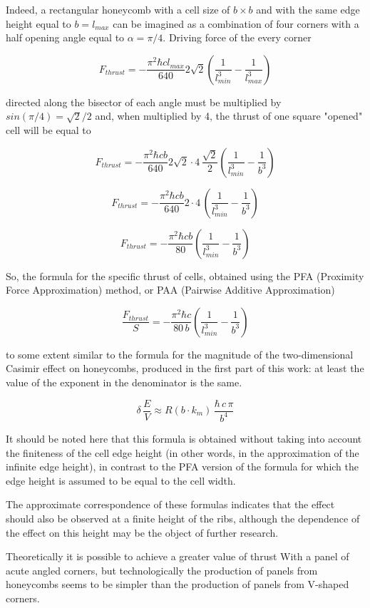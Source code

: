 \documentclass[11pt]{article}
\begin{document}
Indeed, a rectangular honeycomb with a cell size of \(b \times b\) and
with the same edge height equal to \(b = l_{max}\) can be imagined as a
combination of four corners with a half opening angle equal to
\(\alpha = {\pi}/{4}\). Driving force of the every corner

\[F_{thrust} = - \frac{\pi^2\hbar c l_{max}}{640} 2\sqrt{2} \left(\frac{1}{l_{min}^3} - \frac{1}{l_{max}^3}\right)\]

directed along the bisector of each angle must be multiplied by
\(sin\left({\pi}/{4}\right)={\sqrt{2}}\big/{2}\) and, when multiplied by
4, the thrust of one square "opened" cell will be equal to

\[F_{thrust} = - \frac{\pi^2\hbar c b}{640} 2\sqrt{2}\cdot4\,\frac{\sqrt{2}}{2} \left(\frac{1}{l_{min}^3} - \frac{1}{b^3}\right)\]

\[F_{thrust} = - \frac{\pi^2\hbar c b}{640} 2\cdot4\,\left(\frac{1}{l_{min}^3} - \frac{1}{b^3}\right)\]

\[F_{thrust} = - \frac{\pi^2\hbar c b}{80} \left(\frac{1}{l_{min}^3} - \frac{1}{b^3}\right)\]

So, the formula for the specific thrust of cells, obtained using the PFA
(Proximity Force Approximation) method, or PAA (Pairwise Additive
Approximation)

\[\frac{F_{thrust}}{S} = - \frac{\pi^2\hbar c}{80\, b} \left(\frac{1}{l_{min}^3} - \frac{1}{b^3}\right)\]

to some extent similar to the formula for the magnitude of the
two-dimensional Casimir effect on honeycombs, produced in the first part
of this work: at least the value of the exponent in the denominator is
the same.

\[\delta\,\frac{E}{V} \approx R\left(b \cdot k_m\right)\,\frac{\hbar\,c\,\pi}{b^4}\]

It should be noted here that this formula is obtained without taking
into account the finiteness of the cell edge height (in other words, in
the approximation of the infinite edge height), in contrast to the PFA
version of the formula for which the edge height is assumed to be equal
to the cell width.

The approximate correspondence of these formulas indicates that the
effect should also be observed at a finite height of the ribs, although
the dependence of the effect on this height may be the object of further
research.

Theoretically it is possible to achieve a greater value of thrust With a
panel of acute angled corners, but technologically the production of
panels from honeycombs seems to be simpler than the production of panels
from V-shaped corners.
\end{document}
